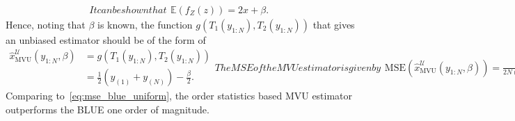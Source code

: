 \documentclass{article}
\newcommand{\E}{\mathbb{E}}
\newcommand{\MSE}{\mathrm{MSE}}
\begin{document}
\begin{subequations}
	It can be shown that
	\begin{align}
	\E(f_Z(z)) = 2x + \beta.
	\end{align}
\end{subequations}
%
%
Hence, noting that $\beta$ is known, the function $g(T_1(y_{1:N}),T_2(y_{1:N}))$ that gives an unbiased estimator should be of the form of
%
%
\begin{subequations}
	\begin{align}
	\hat{x}_{\mathrm{MVU}}^{\mathcal{U}}(y_{1:N},\beta) &= g(T_1(y_{1:N}),T_2(y_{1:N}))\nonumber\\
	&= \frac{1}{2}(y_{(1)}+ y_{(N)}) - \frac{\beta}{2}.
	\end{align}
	The MSE of the MVU estimator is given by
	\begin{align}
	\MSE\left(\hat{x}_{\mathrm{MVU}}^{\mathcal{U}}(y_{1:N},\beta) \right) = \frac{\beta^2}{2N(N+3)+4}.\label{eq:mse_mvu_unif_known}
	\end{align}
\end{subequations}
%
%
Comparing to~\eqref{eq:mse_blue_uniform}, %
the order statistics based MVU estimator outperforms the BLUE one order of magnitude. 
\end{document}
